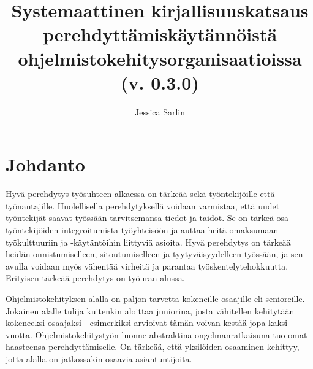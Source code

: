 \documentclass[utf8]{gradu3}
\begin{document}
\title{Systemaattinen kirjallisuuskatsaus perehdyttämiskäytännöistä ohjelmistokehitysorganisaatioissa (v. 0.3.0)}




\author{Jessica Sarlin}


\maketitle

\mainmatter

\chapter{Johdanto}



Hyvä perehdytys työsuhteen alkaessa on tärkeää sekä työntekijöille että työnantajille. Huolellisella perehdytyksellä voidaan varmistaa, että uudet työntekijät saavat työssään tarvitsemansa tiedot ja taidot. Se on tärkeä osa työntekijöiden integroitumista työyhteisöön ja auttaa heitä omaksumaan työkulttuuriin ja -käytäntöihin liittyviä asioita. Hyvä perehdytys on tärkeää heidän onnistumiselleen, sitoutumiselleen ja tyytyväisyydelleen työssään, ja sen avulla voidaan myös vähentää virheitä ja parantaa työskentelytehokkuutta. Erityisen tärkeää perehdytys on työuran alussa.

Ohjelmistokehityksen alalla on paljon tarvetta kokeneille osaajille eli senioreille. Jokainen alalle tulija kuitenkin aloittaa juniorina, josta vähitellen kehitytään kokeneeksi osaajaksi - esimerkiksi \textcite{bologa-lupu-2014} arvioivat tämän voivan kestää jopa kaksi vuotta. Ohjelmistokehitystyön luonne abstraktina ongelmanratkaisuna tuo omat haasteensa perehdyttämiselle. On tärkeää, että yksilöiden osaaminen kehittyy, jotta alalla on jatkossakin osaavia asiantuntijoita.
\end{document}
